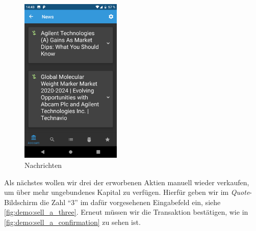 \documentclass[a4paper]{article}
\begin{document}
\begin{figure}[H]
	\centering
	\includegraphics[height=8cm,keepaspectratio]{./images/demo/news.png}
	\caption{Nachrichten}
	\label{fig:demo:news}
\end{figure}

Als nächstes wollen wir drei der erworbenen Aktien manuell wieder verkaufen, um über mehr ungebundenes Kapital zu verfügen.
Hierfür geben wir im \textit{Quote}-Bildschirm die Zahl "`3"' im dafür vorgesehenen Eingabefeld ein, siehe \autoref{fig:demo:sell_a_three}.
Erneut müssen wir die Transaktion bestätigen, wie in \autoref{fig:demo:sell_a_confirmation} zu sehen ist.
\end{document}
